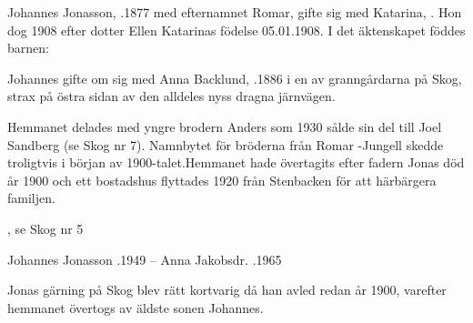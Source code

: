 


Johannes Jonasson, .1877 med efternamnet Romar, gifte sig med Katarina, . Hon dog 1908 efter dotter Ellen Katarinas födelse 05.01.1908. I det äktenskapet föddes barnen:

\begin{jhchildren}
  \item {}
  \item {}
  \item {}
\end{jhchildren}

Johannes gifte om sig med Anna Backlund, .1886 i en av granngårdarna på Skog, strax på östra sidan av den alldeles nyss dragna järnvägen.

Hemmanet delades med yngre brodern Anders som 1930 sålde sin del till Joel Sandberg (se Skog nr 7). Namnbytet för bröderna från Romar -Jungell skedde troligtvis i början av 1900-talet.Hemmanet hade övertagits efter fadern Jonas död år 1900 och ett bostadshus flyttades 1920 från Stenbacken för att härbärgera familjen.

\begin{jhchildren}
  \item {}, se Skog nr 5
  \item {}
  \item {}
  \item {}
\end{jhchildren}

Johannes Jonasson .1949   --   Anna Jakobsdr. .1965



Jonas gärning på Skog blev rätt kortvarig då han avled redan år 1900, varefter hemmanet övertogs av äldste sonen Johannes.

\begin{jhchildren}
  \item {}
  \item {}
  \item {}
  \item {}
  \item {}
  \item {}
  \item {}
\end{jhchildren}

